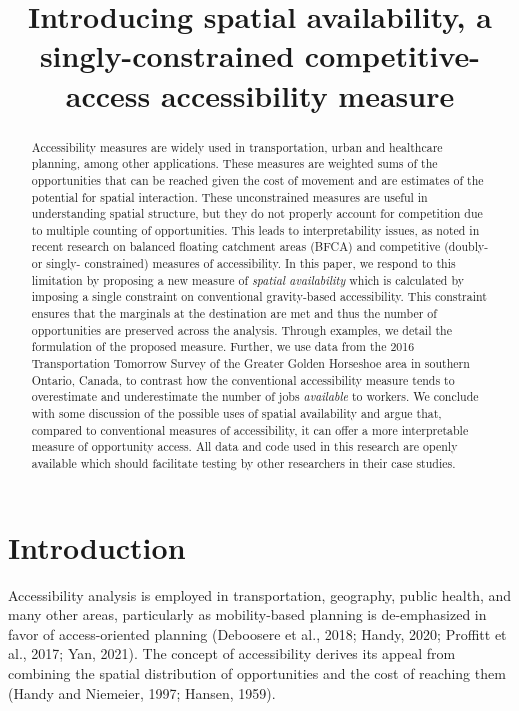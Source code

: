 \documentclass[]{elsarticle} %
\begin{document}
\begin{frontmatter}

  \title{Introducing spatial availability, a singly-constrained
competitive-access accessibility measure}
      
  \begin{abstract}
  Accessibility measures are widely used in transportation, urban and
  healthcare planning, among other applications. These measures are
  weighted sums of the opportunities that can be reached given the cost
  of movement and are estimates of the potential for spatial
  interaction. These unconstrained measures are useful in understanding
  spatial structure, but they do not properly account for competition
  due to multiple counting of opportunities. This leads to
  interpretability issues, as noted in recent research on balanced
  floating catchment areas (BFCA) and competitive (doubly- or singly-
  constrained) measures of accessibility. In this paper, we respond to
  this limitation by proposing a new measure of \emph{spatial
  availability} which is calculated by imposing a single constraint on
  conventional gravity-based accessibility. This constraint ensures that
  the marginals at the destination are met and thus the number of
  opportunities are preserved across the analysis. Through examples, we
  detail the formulation of the proposed measure. Further, we use data
  from the 2016 Transportation Tomorrow Survey of the Greater Golden
  Horseshoe area in southern Ontario, Canada, to contrast how the
  conventional accessibility measure tends to overestimate and
  underestimate the number of jobs \emph{available} to workers. We
  conclude with some discussion of the possible uses of spatial
  availability and argue that, compared to conventional measures of
  accessibility, it can offer a more interpretable measure of
  opportunity access. All data and code used in this research are openly
  available which should facilitate testing by other researchers in
  their case studies.
  \end{abstract}
  
 \end{frontmatter}

\newpage

\hypertarget{introduction}{%
\section{Introduction}\label{introduction}}

Accessibility analysis is employed in transportation, geography, public
health, and many other areas, particularly as mobility-based planning is
de-emphasized in favor of access-oriented planning (Deboosere et al.,
2018; Handy, 2020; Proffitt et al., 2017; Yan, 2021). The concept of
accessibility derives its appeal from combining the spatial distribution
of opportunities and the cost of reaching them (Handy and Niemeier,
1997; Hansen, 1959).
\end{document}
